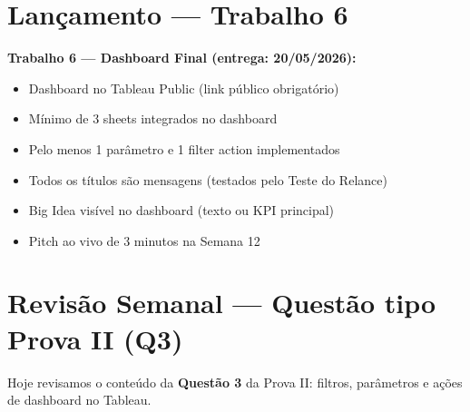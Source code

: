 \section{Lançamento — Trabalho 6}

\begin{SolvedBox}
\textbf{Trabalho 6 — Dashboard Final (entrega: 20/05/2026):}
\begin{itemize}
  \item[$\square$] Dashboard no Tableau Public (link público obrigatório)
  \item[$\square$] Mínimo de 3 sheets integrados no dashboard
  \item[$\square$] Pelo menos 1 parâmetro e 1 filter action implementados
  \item[$\square$] Todos os títulos são mensagens (testados pelo Teste do Relance)
  \item[$\square$] Big Idea visível no dashboard (texto ou KPI principal)
  \item[$\square$] Pitch ao vivo de 3 minutos na Semana 12
\end{itemize}
\end{SolvedBox}

\section{Revisão Semanal — Questão tipo Prova II (Q3)}

\begin{NoteBox}
Hoje revisamos o conteúdo da \textbf{Questão 3} da Prova II:
filtros, parâmetros e ações de dashboard no Tableau.
\end{NoteBox}

